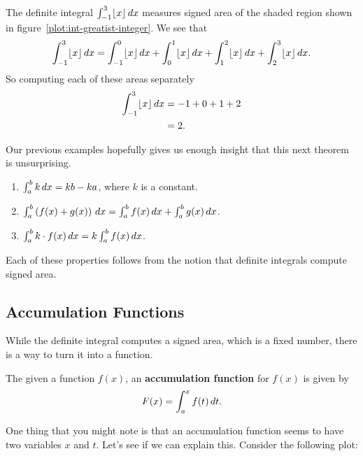 \begin{solution}
The definite integral $\int_{-1}^3 \lfloor x\rfloor \, d x$ measures
signed area of the shaded region shown in
figure~\ref{plot:int-greatist-integer}. We see that 
\[
\int_{-1}^3 \lfloor x\rfloor \, d x = 
\int_{-1}^0 \lfloor x\rfloor \, d x + \int_{0}^1 \lfloor x\rfloor \, d x + \int_{1}^2 \lfloor x\rfloor \, d x + \int_{2}^3 \lfloor x\rfloor \, d x.
\]
So computing each of these areas separately
\begin{align*}
\int_{-1}^3 \lfloor x\rfloor \, d x &= -1 + 0 + 1+2 \\
&= 2.
\end{align*}
\end{solution}

Our previous examples hopefully gives us enough insight that this next
theorem is unsurprising.

\begin{mainTheorem}
\begin{enumerate}
\item $\int_a^b k \, d x= kb-ka$, where $k$ is a constant.
\item $\int_a^b \left( f(x) + g(x) \right) \, d x = \int_a^b f(x) \, d x + \int_a^b
  g(x) \, d x$.
\item $\int_a^b k \cdot f(x) \, d x = k \int_a^b f(x) \, d x$.
\end{enumerate}
\end{mainTheorem}
Each of these properties follows from the notion that definite
integrals compute signed area.

\subsection*{Accumulation Functions}

While the definite integral computes a signed area, which is a fixed
number, there is a way to turn it into a function.
\begin{definition}
The given a function $f(x)$, an \textbf{accumulation function} for
$f(x)$ is given by
\[
F(x) = \int_a^x f(t) \, d t.
\]
\end{definition}

One thing that you might note is that an accumulation function seems
to have two variables $x$ and $t$. Let's see if we can explain
this. Consider the following plot:

